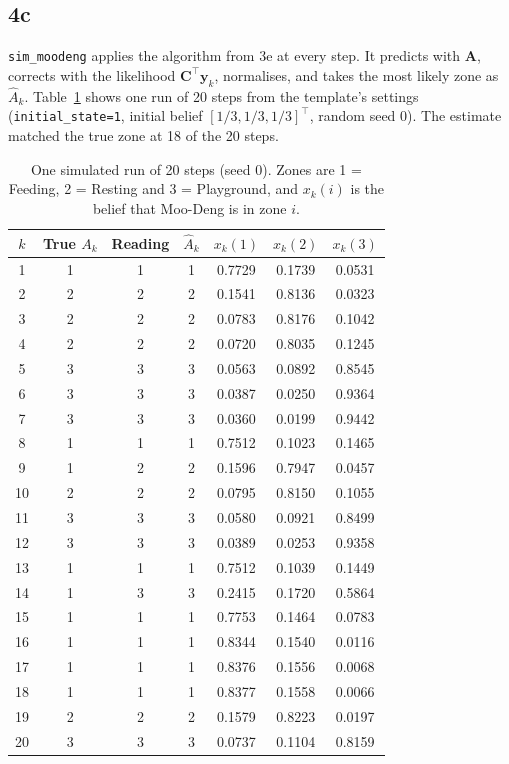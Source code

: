 \documentclass[11pt]{article}
\newcommand{\vect}[1]{\mathbf{#1}}
\newcommand{\mat}[1]{\mathbf{#1}}
\begin{document}
\subsection*{4c}

\texttt{sim\_moodeng} applies the algorithm from 3e at every step. It predicts with $\mat{A}$, corrects with the likelihood $\mat{C}^\top\vect{y}_k$, normalises, and takes the most likely zone as $\hat{A}_k$. Table~\ref{tab:q4c} shows one run of 20 steps from the template's settings (\texttt{initial\_state=1}, initial belief $[1/3, 1/3, 1/3]^\top$, random seed 0). The estimate matched the true zone at 18 of the 20 steps.

\begin{table}[h!]
    \centering
    \small
    \begin{tabular}{ccccccc}
        \toprule
        $k$ & True $A_k$ & Reading & $\hat{A}_k$ & $x_k(1)$ & $x_k(2)$ & $x_k(3)$ \\
        \midrule
        1 & 1 & 1 & 1 & 0.7729 & 0.1739 & 0.0531 \\
        2 & 2 & 2 & 2 & 0.1541 & 0.8136 & 0.0323 \\
        3 & 2 & 2 & 2 & 0.0783 & 0.8176 & 0.1042 \\
        4 & 2 & 2 & 2 & 0.0720 & 0.8035 & 0.1245 \\
        5 & 3 & 3 & 3 & 0.0563 & 0.0892 & 0.8545 \\
        6 & 3 & 3 & 3 & 0.0387 & 0.0250 & 0.9364 \\
        7 & 3 & 3 & 3 & 0.0360 & 0.0199 & 0.9442 \\
        8 & 1 & 1 & 1 & 0.7512 & 0.1023 & 0.1465 \\
        9 & 1 & 2 & 2 & 0.1596 & 0.7947 & 0.0457 \\
        10 & 2 & 2 & 2 & 0.0795 & 0.8150 & 0.1055 \\
        11 & 3 & 3 & 3 & 0.0580 & 0.0921 & 0.8499 \\
        12 & 3 & 3 & 3 & 0.0389 & 0.0253 & 0.9358 \\
        13 & 1 & 1 & 1 & 0.7512 & 0.1039 & 0.1449 \\
        14 & 1 & 3 & 3 & 0.2415 & 0.1720 & 0.5864 \\
        15 & 1 & 1 & 1 & 0.7753 & 0.1464 & 0.0783 \\
        16 & 1 & 1 & 1 & 0.8344 & 0.1540 & 0.0116 \\
        17 & 1 & 1 & 1 & 0.8376 & 0.1556 & 0.0068 \\
        18 & 1 & 1 & 1 & 0.8377 & 0.1558 & 0.0066 \\
        19 & 2 & 2 & 2 & 0.1579 & 0.8223 & 0.0197 \\
        20 & 3 & 3 & 3 & 0.0737 & 0.1104 & 0.8159 \\
        \bottomrule
    \end{tabular}
    \caption{One simulated run of 20 steps (seed 0). Zones are 1 = Feeding, 2 = Resting and 3 = Playground, and $x_k(i)$ is the belief that Moo-Deng is in zone $i$.}
    \label{tab:q4c}
\end{table}
\end{document}
